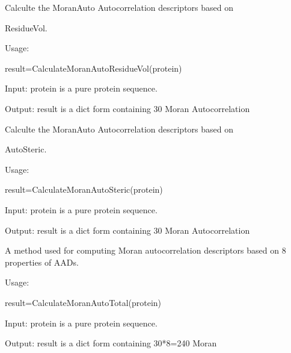 \documentclass[letterpaper,10pt,english]{sphinxmanual}
\begin{document}

\begin{fulllineitems}
\label{reference/Autocorrelation:Autocorrelation.CalculateMoranAutoResidueVol}
Calculte the MoranAuto Autocorrelation descriptors based on

ResidueVol.

Usage:

result=CalculateMoranAutoResidueVol(protein)

Input: protein is a pure protein sequence.

Output: result is a dict form containing 30 Moran Autocorrelation

\end{fulllineitems}


\begin{fulllineitems}
\label{reference/Autocorrelation:Autocorrelation.CalculateMoranAutoSteric}
Calculte the MoranAuto Autocorrelation descriptors based on

AutoSteric.

Usage:

result=CalculateMoranAutoSteric(protein)

Input: protein is a pure protein sequence.

Output: result is a dict form containing 30 Moran Autocorrelation

\end{fulllineitems}


\begin{fulllineitems}
\label{reference/Autocorrelation:Autocorrelation.CalculateMoranAutoTotal}
A method used for computing Moran autocorrelation descriptors based on 8 properties of AADs.

Usage:

result=CalculateMoranAutoTotal(protein)

Input: protein is a pure protein sequence.

Output: result is a dict form containing 30*8=240 Moran

\end{fulllineitems}
\end{document}
